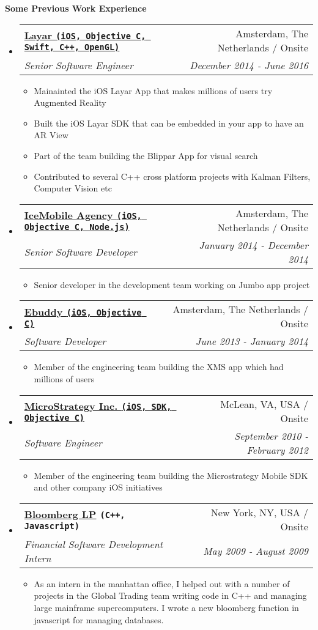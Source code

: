 \documentclass[letterpaper,11pt]{article}
\makeatletter
\newcommand{\resitem}[1]{\item #1 \vspace{-2pt}}
\newcommand{\resheading}[1]{{\large \colorbox{mygrey}{\begin{minipage}{\textwidth}{\textbf{#1 \vphantom{p\^{E}}}}\end{minipage}}}}
\newcommand{\ressubheading}[4]{
\begin{tabular*}{7.0in}{l@{\extracolsep{\fill}}r}
    \textbf{#1} & #2 \\
    \textit{#3} & \textit{#4} \\
\end{tabular*}\vspace{-6pt}}
\makeatother
\begin{document}
\resheading{Some Previous Work Experience}
\begin{itemize}

\item
    \ressubheading{\href{https://www.layar.com/}{Layar  \texttt{(iOS, Objective C, Swift, C++, OpenGL)}}}{Amsterdam, The Netherlands / Onsite}{Senior Software Engineer}{December 2014 - June 2016}
    \begin{itemize}
        \resitem{Mainainted the iOS Layar App that makes millions of users try Augmented Reality}
        \resitem{Built the iOS Layar SDK that can be embedded in your app to have an AR View}
        \resitem{Part of the team building the Blippar App for visual search}
        \resitem{Contributed to several C++ cross platform projects with Kalman Filters, Computer Vision etc}
    \end{itemize}

\item
    \ressubheading{\href{http://www.icemobile.com}{IceMobile Agency \texttt{(iOS, Objective C, Node.js)}}}{Amsterdam, The Netherlands / Onsite}{Senior Software Developer}{January 2014 - December 2014}
    \begin{itemize}
        \resitem{Senior developer in the development team working on Jumbo app project}
    \end{itemize}

\item
    \ressubheading{\href{http://www.ebuddy.com}{Ebuddy \texttt{(iOS, Objective C)}}}{Amsterdam, The Netherlands / Onsite}{Software Developer}{June 2013 - January 2014}
    \begin{itemize}
        \resitem{Member of the engineering team building the XMS app which had millions of users}
    \end{itemize}

\item
    \ressubheading{\href{http://www.microstrategy.com/Company}{MicroStrategy Inc. \texttt{(iOS, SDK, Objective C)}}}{McLean, VA, USA / Onsite}{Software Engineer}{September 2010 - February 2012}
    \begin{itemize}
        \resitem{Member of the engineering team building the Microstrategy Mobile SDK and other company iOS initiatives}
    \end{itemize}
    
\item
    \ressubheading{\href{http://www.bloomberg.com}{Bloomberg LP} \texttt{(C++, Javascript)}}{New York, NY, USA / Onsite}{Financial Software Development Intern}{May 2009 - August 2009}
    \begin{itemize}
      \resitem{As an intern in the manhattan office, I helped out with a number of projects in the Global Trading team writing code in C++ and managing large mainframe supercomputers. I wrote a new bloomberg function in javascript for managing databases.}
    \end{itemize}
    
    
\end{itemize}
\end{document}
